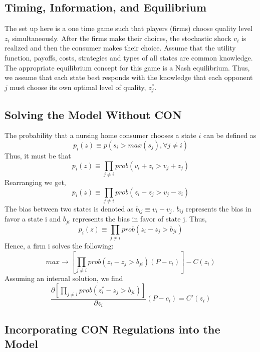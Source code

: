 \documentclass[../Main.tex]{subfiles}
\begin{document}
\subsection{Timing, Information, and Equilibrium}
The set up here is a one time game such that players (firms) choose quality level $z_i$ simultaneously. After the firms make their choices, the stochastic shock $v_i$ is realized and then the consumer makes their choice. Assume that the utility function, payoffs, costs, strategies and types of all states are common knowledge. The appropriate equilibrium concept for this game is a Nash equilibrium. Thus, we assume that each state best responds with the knowledge that each opponent $j$ must choose its own optimal level of quality, $z_j^*$.

\subsection{Solving the Model Without CON}
The probability that a nursing home consumer chooses a state $i$ can be defined as \begin{equation}p_i(z) \equiv p(s_i> max(s_j), \forall j \neq i )\end{equation}
Thus, it must be that \begin{equation}p_i(z) \equiv \prod_{j\neq i} prob(v_i + z_i > v_j + z_j) \end{equation} 
Rearranging we get,
 \begin{equation}p_i(z) \equiv \prod_{j\neq i} prob(z_i-z_j > v_j - v_i) \end{equation} 
The bias between two states is denoted as $b_{ij} \equiv v_i -v_j $. $b_{ij}$ represents the bias in favor a state i and $b_{ji}$ represents the bias in favor of state j. Thus,\begin{equation}p_i(z) \equiv \prod_{j\neq i} prob(z_i -z_j > b_{ji}) \end{equation}  
Hence, a firm i solves the following:\begin{equation}max \rightarrow [\prod_{j\neq i} prob(z_i -z_j > b_{ji})(P-c_i)] - C(z_i)\end{equation}
Assuming an internal solution, we find 
 \begin{equation}\frac{\partial [\prod_{j\neq i} prob(z_i^* -z_j > b_{ji})]}{\partial z_i}(P-c_i) = C'(z_i) \end{equation}

\subsection{Incorporating CON Regulations into the Model}
\end{document}
